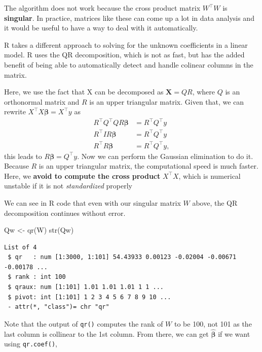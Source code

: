 \documentclass[
  letterpaper,
  DIV=11,
  numbers=noendperiod]{scrreprt}
\newenvironment{Shaded}{\begin{snugshade}}{\end{snugshade}}
\newcommand{\FunctionTok}[1]{\textcolor[rgb]{0.28,0.35,0.67}{#1}}
\newcommand{\NormalTok}[1]{\textcolor[rgb]{0.00,0.23,0.31}{#1}}
\newcommand{\OtherTok}[1]{\textcolor[rgb]{0.00,0.23,0.31}{#1}}
\begin{document}
The algorithm does not work because the cross product matrix
\(W^\top W\) is \textbf{singular}. In practice, matrices like these can
come up a lot in data analysis and it would be useful to have a way to
deal with it automatically.

R takes a different approach to solving for the unknown coefficients in
a linear model. R uses the QR decomposition, which is not as fast, but
has the added benefit of being able to automatically detect and handle
colinear columns in the matrix.

Here, we use the fact that X can be decomposed as \(\boldsymbol{X}=QR\),
where \(Q\) is an orthonormal matrix and \(R\) is an upper triangular
matrix. Given that, we can rewrite
\(X^\top X \boldsymbol{\beta}= X^\top y\) as \begin{align*}
R^\top Q^\top Q R \boldsymbol{\beta}&= R^\top Q^\top y\\
R^\top I R \boldsymbol{\beta}&= R^\top Q^\top y\\
R^\top R \boldsymbol{\beta}&= R^\top Q^\top y,
\end{align*} this leads to \(R\boldsymbol{\beta}= Q^\top y\). Now we can
perform the Gaussian elimination to do it. Because \(R\) is an upper
triangular matrix, the computational speed is much faster. Here, we
\textbf{avoid to compute the cross product} \(X^\top X\), which is
numerical unstable if it is not \emph{standardized} properly

We can see in R code that even with our singular matrix \(W\) above, the
QR decomposition continues without error.

\begin{Shaded}
\begin{Highlighting}[]
\NormalTok{Qw }\OtherTok{\textless{}{-}} \FunctionTok{qr}\NormalTok{(W)}
\FunctionTok{str}\NormalTok{(Qw)}
\end{Highlighting}
\end{Shaded}

\begin{verbatim}
List of 4
 $ qr   : num [1:3000, 1:101] 54.43933 0.00123 -0.02004 -0.00671 -0.00178 ...
 $ rank : int 100
 $ qraux: num [1:101] 1.01 1.01 1.01 1 1 ...
 $ pivot: int [1:101] 1 2 3 4 5 6 7 8 9 10 ...
 - attr(*, "class")= chr "qr"
\end{verbatim}

Note that the output of \texttt{qr()} computes the rank of \(W\) to be
100, not 101 as the last column is collinear to the 1st column. From
there, we can get \(\hat{\boldsymbol{\beta}}\) if we want using
\texttt{qr.coef()},
\end{document}
